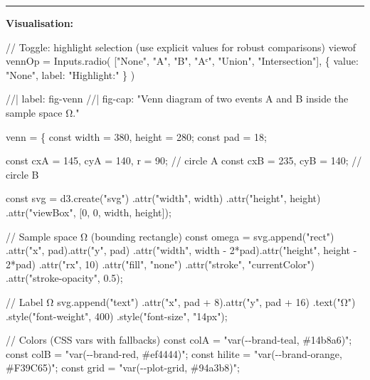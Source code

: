 \documentclass[
  letterpaper,
  DIV=11,
  numbers=noendperiod]{scrreprt}
\newenvironment{Shaded}{\begin{snugshade}}{\end{snugshade}}
\newcommand{\NormalTok}[1]{\textcolor[rgb]{0.00,0.23,0.31}{#1}}
\theoremstyle{definition}
\theoremstyle{plain}
\theoremstyle{definition}
\theoremstyle{remark}
\begin{document}
\begin{center}\rule{0.5\linewidth}{0.5pt}\end{center}

\textbf{Visualisation:}

\begin{Shaded}
\begin{Highlighting}[]
\NormalTok{// Toggle: highlight selection (use explicit values for robust comparisons)}
\NormalTok{viewof vennOp = Inputs.radio(}
\NormalTok{  ["None", "A", "B", "Aᶜ", "Union", "Intersection"],}
\NormalTok{  \{ value: "None", label: "Highlight:" \}}
\NormalTok{)}

\end{Highlighting}
\end{Shaded}

\begin{Shaded}
\begin{Highlighting}[]
\NormalTok{//| label: fig{-}venn}
\NormalTok{//| fig{-}cap: "Venn diagram of two events A and B inside the sample space Ω."}

\NormalTok{venn = \{}
\NormalTok{  const width = 380, height = 280;}
\NormalTok{  const pad = 18;}

\NormalTok{  const cxA = 145, cyA = 140, r = 90;   // circle A}
\NormalTok{  const cxB = 235, cyB = 140;           // circle B}

\NormalTok{  const svg = d3.create("svg")}
\NormalTok{    .attr("width", width)}
\NormalTok{    .attr("height", height)}
\NormalTok{    .attr("viewBox", [0, 0, width, height]);}

\NormalTok{  // Sample space Ω (bounding rectangle)}
\NormalTok{  const omega = svg.append("rect")}
\NormalTok{    .attr("x", pad).attr("y", pad)}
\NormalTok{    .attr("width", width {-} 2*pad).attr("height", height {-} 2*pad)}
\NormalTok{    .attr("rx", 10)}
\NormalTok{    .attr("fill", "none")}
\NormalTok{    .attr("stroke", "currentColor")}
\NormalTok{    .attr("stroke{-}opacity", 0.5);}

\NormalTok{  // Label Ω}
\NormalTok{  svg.append("text")}
\NormalTok{    .attr("x", pad + 8).attr("y", pad + 16)}
\NormalTok{    .text("Ω")}
\NormalTok{    .style("font{-}weight", 400)}
\NormalTok{    .style("font{-}size", "14px");}

\NormalTok{  // Colors (CSS vars with fallbacks)}
\NormalTok{  const colA   = "var({-}{-}brand{-}teal, \#14b8a6)";}
\NormalTok{  const colB   = "var({-}{-}brand{-}red, \#ef4444)";}
\NormalTok{  const hilite = "var({-}{-}brand{-}orange, \#F39C65)";}
\NormalTok{  const grid   = "var({-}{-}plot{-}grid, \#94a3b8)";}


\end{Highlighting}
\end{Shaded}
\end{document}
